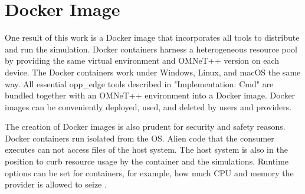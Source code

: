 \section{Docker Image}
One result of this work is a Docker image that incorporates all tools to distribute and run the simulation. Docker containers harness a heterogeneous resource pool by providing the same virtual environment and OMNeT++ version on each device. The Docker containers work under Windows, Linux, and macOS the same way. All essential opp\_edge tools described in "Implementation: Cmd" are bundled together with an OMNeT++ environment into a Docker image. Docker images can be conveniently deployed, used, and deleted by users and providers.

The creation of Docker images is also prudent for security and safety reasons. Docker containers run isolated from the OS. Alien code that the consumer executes can not access files of the host system. The host system is also in the position to curb resource usage by the container and the simulations. Runtime options can be set for containers, for example, how much CPU and memory the provider is allowed to seize \cite{docker:resource_constraints}.
